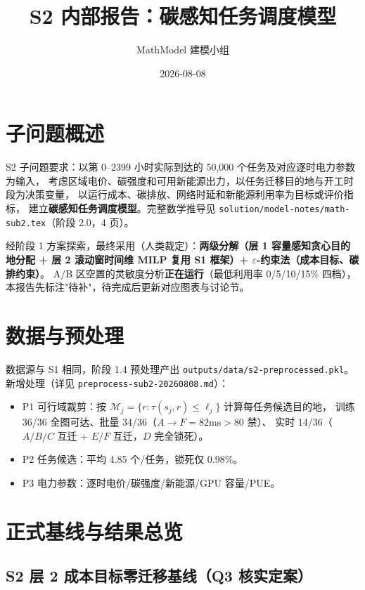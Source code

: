 \documentclass{internal-report}
\title{S2 内部报告：碳感知任务调度模型}
\author{MathModel 建模小组}
\date{2026-08-08}
\begin{document}
\maketitle

\section{子问题概述}

S2 子问题要求：以第 0--2399 小时实际到达的 50{,}000 个任务及对应逐时电力参数为输入，
考虑区域电价、碳强度和可用新能源出力，以任务迁移目的地与开工时段为决策变量，
以运行成本、碳排放、网络时延和新能源利用率为目标或评价指标，
建立\textbf{碳感知任务调度模型}。完整数学推导见
\texttt{solution/model-notes/math-sub2.tex}（阶段 2.0，4 页）。

经阶段 1 方案探索，最终采用（人类裁定）：\textbf{两级分解（层 1 容量感知贪心目的地分配
+ 层 2 滚动窗时间维 MILP 复用 S1 框架）+ $\varepsilon$-约束法（成本目标、碳排约束）}。
A/B 区空置的灵敏度分析\textbf{正在运行}（最低利用率 0/5/10/15\% 四档），
本报告先标注"待补"，待完成后更新对应图表与讨论节。

\section{数据与预处理}

数据源与 S1 相同，阶段 1.4 预处理产出 \texttt{outputs/data/s2-preprocessed.pkl}。
新增处理（详见 \texttt{preprocess-sub2-20260808.md}）：
\begin{itemize}
  \item P1 可行域裁剪：按 $ \mathcal{M}_j = \{ r : \tau(s_j, r) \le \ell_j \} $ 计算每任务候选目的地，
        训练 36/36 全图可达、批量 34/36（$A\to F=82\text{ms}>80$ 禁）、
        实时 14/36（$A/B/C$ 互迁 + $E/F$ 互迁，$D$ 完全锁死）。
  \item P2 任务候选：平均 4.85 个/任务，锁死仅 0.98\%。
  \item P3 电力参数：逐时电价/碳强度/新能源/GPU 容量/PUE。
\end{itemize}

\section{正式基线与结果总览}

\subsection{S2 层 2 成本目标零迁移基线（Q3 核实定案）}
\end{document}
